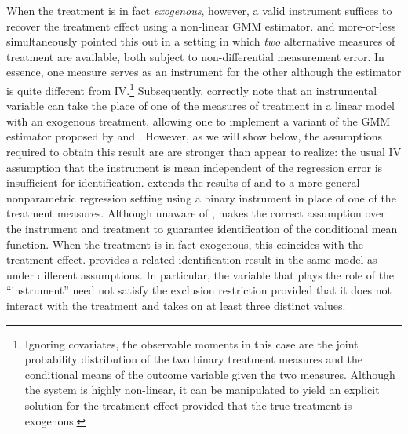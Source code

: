 When the treatment is in fact \emph{exogenous}, however, a valid instrument suffices to recover the treatment effect using a non-linear GMM estimator.
\cite{BBS} and \cite{KRS} more-or-less simultaneously pointed this out in a setting in which \emph{two} alternative measures of treatment are available, both subject to non-differential measurement error.
In essence, one measure serves as an instrument for the other although the estimator is quite different from IV.\footnote{Ignoring covariates, the observable moments in this case are the joint probability distribution of the two binary treatment measures and the conditional means of the outcome variable given the two measures. Although the system is highly non-linear, it can be manipulated to yield an explicit solution for the treatment effect provided that the true treatment is exogenous.}
Subsequently, \cite{FL} correctly note that an instrumental variable can take the place of one of the measures of treatment in a linear model with an exogenous treatment, allowing one to implement a variant of the GMM estimator proposed by \cite{BBS} and \cite{KRS}.
However, as we will show below, the assumptions required to obtain this result are are stronger than \cite{FL} appear to realize: the usual IV assumption that the instrument is mean independent of the regression error is insufficient for identification. 
\cite{Mahajan} extends the results of \cite{BBS} and \cite{KRS} to a more general nonparametric regression setting using a binary instrument in place of one of the treatment measures. 
Although unaware of \cite{FL}, \cite{Mahajan} makes the correct assumption over the instrument and treatment to guarantee identification of the conditional mean function.
When the treatment is in fact exogenous, this coincides with the treatment effect.
\cite{Lewbel} provides a related identification result in the same model as \cite{Mahajan} under different assumptions.
In particular, the variable that plays the role of the ``instrument'' need not satisfy the exclusion restriction provided that it does not interact with the treatment and takes on at least three distinct values. 



